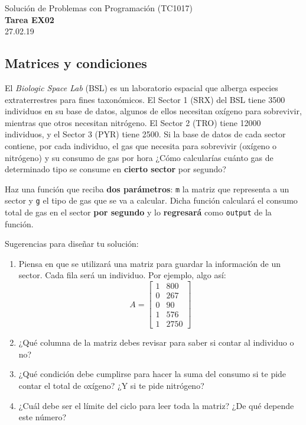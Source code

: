 \documentclass[]{book}
\theoremstyle{definition}
\begin{document}
\begin{center}
{\huge Solución de Problemas con Programación (TC1017)}\\[1.5ex]
{\large \textbf{Tarea EX02}\\[1.5ex] %
27.02.19} %
\end{center}

\vspace{0.2 cm}

\subsection*{Matrices y condiciones}

El \textit{Biologic Space Lab} (BSL) es un laboratorio espacial que alberga especies extraterrestres para fines taxonómicos.
El Sector 1 (SRX) del BSL tiene 3500 individuos en su base de datos, algunos de ellos necesitan oxígeno para sobrevivir, mientras que otros necesitan nitrógeno. El Sector 2 (TRO) tiene 12000 individuos, y el Sector 3 (PYR) tiene 2500.
Si la base de datos de cada sector contiene, por cada individuo, el gas que necesita para sobrevivir (oxígeno o nitrógeno) y su consumo de gas por hora ¿Cómo calcularías cuánto gas de determinado tipo se consume en \textbf{cierto sector} por segundo?

Haz una función que reciba \textbf{dos parámetros}: \texttt{m} la matriz que representa a un sector y \texttt{g} el tipo de gas que se va a calcular.
Dicha función calculará el consumo total de gas en el sector \textbf{por segundo} y lo \textbf{regresará} como \texttt{output} de la función.

Sugerencias para diseñar tu solución:
\begin{enumerate}[label=\alph*)]
    \item Piensa en que se utilizará una matriz para guardar la información de un sector. Cada fila será un individuo. Por ejemplo, algo así:
    $$A = \begin{bmatrix}
       1 & 800 \\
       0 & 267 \\
       0 & 90 \\
       1 & 576 \\
       1 & 2750
    \end{bmatrix}$$
    \item ¿Qué columna de la matriz debes revisar para saber si contar al individuo o no?
    \item ¿Qué condición debe cumplirse para hacer la suma del consumo si te pide contar el total de oxígeno? ¿Y si te pide nitrógeno?
    \item ¿Cuál debe ser el límite del ciclo para leer toda la matriz? ¿De qué depende este número?
\end{enumerate}
\end{document}
